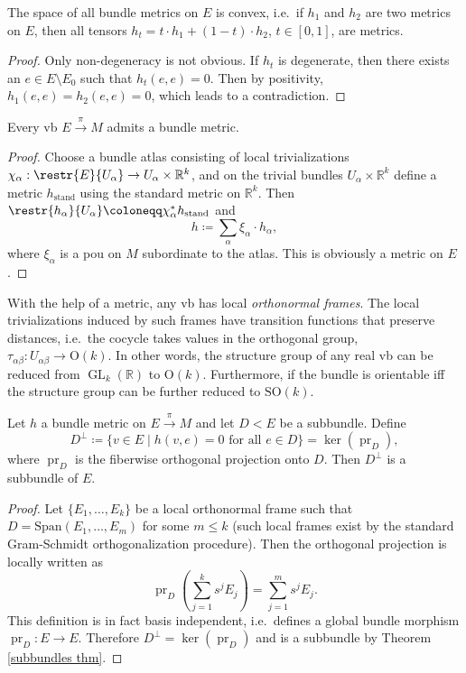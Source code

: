 \documentclass[english,letterpaper]{article}%
\numberwithin{equation}{section}
\numberwithin{figure}{section}
\numberwithin{table}{section}
\theoremstyle{definition}
\theoremstyle{definition}
\theoremstyle{definition}
\theoremstyle{plain}
\theoremstyle{plain}
\theoremstyle{plain}
\theoremstyle{plain}
\theoremstyle{remark}
\theoremstyle{remark}
\renewcommand{\leq}{\leqslant}
\DeclareMathOperator{\pr}{pr}
\DeclareMathOperator{\GL}{GL}
\begin{document}
\begin{prop}
The space of all bundle metrics on $E$ is convex, i.e.\ if $h_1$ and $h_2$ are two metrics on $E$, then all tensors $h_t=t \cdot h_1+(1-t)\cdot h_2$, $t\in[0,1]$, are metrics.
\end{prop}
\begin{proof}
Only non-degeneracy is not obvious. If $h_t$ is degenerate, then there exists an $e\in E\setminus E_0$ such that $h_t(e,e)=0$. Then by positivity, $h_1(e,e)=h_2(e,e)=0$, which leads to a contradiction.
\end{proof}

\begin{thm}
Every \gls{vb} $E\overset\pi\to M$ admits a bundle metric. 
\end{thm}
\begin{proof}
Choose a bundle atlas consisting of local trivializations $\chi_\alpha:\restr{E}{U_\alpha}\to U_\alpha\times\mathbb{R}^k$, and on the trivial bundles $U_\alpha\times\mathbb{R}^k$ define a metric $h_{\text{stand}}$ using the standard metric on $\mathbb{R}^k$. Then $\restr{h_\alpha}{U_\alpha}\coloneqq \chi_\alpha^\ast h_{\text{stand}}$ and 
\[h\coloneqq \sum_\alpha \xi_\alpha \cdot h_\alpha,\]
where $\xi_\alpha$ is a \gls{pou} on $M$ subordinate to the atlas. This is obviously a metric on $E$.
\end{proof}
\begin{cor}
With the help of a metric, any \gls{vb} has local \emph{orthonormal frames}. The local trivializations induced by such frames have transition functions that preserve distances, i.e.\ the cocycle takes values in the orthogonal group, $\tau_{\alpha\beta}:U_{\alpha\beta}\to \mathrm{O}(k)$. In other words, the structure group of any real \gls{vb} can be reduced from $\GL_k(\mathbb{R})$ to $\mathrm{O}(k)$. Furthermore, if the bundle is orientable iff the structure group can be further reduced to $\mathrm{SO}(k)$.
\end{cor}

\begin{prop}
Let $h$ a bundle metric on $E\overset\pi\to M$ and let $D< E$ be a subbundle. Define
\[D^\perp \coloneqq \{v\in E\mid h(v,e)=0 \text{ for all }e\in D\}=\ker (\pr_D),\]
where $\pr_D$ is the fiberwise orthogonal projection onto $D$. Then $D^\perp$ is a subbundle of $E$.
\end{prop}
\begin{proof}
Let $\{E_1,\ldots,E_k\}$ be a local orthonormal frame such that $D=\mathrm{Span}(E_1,\ldots,E_m)$ for some $m\leq k$ (such local frames exist by the standard Gram-Schmidt orthogonalization procedure). Then the orthogonal projection is locally written as
\[\pr_D \left(\sum_{j=1}^k s^j E_j\right)=\sum_{j=1}^m s^j E_j.\]
This definition is in fact basis independent, i.e.\ defines a global bundle morphism $\pr_D:E\to E$. Therefore $D^\perp =\ker (\pr_D)$ and is a subbundle by Theorem \ref{subbundles thm}.
\end{proof}
\end{document}
